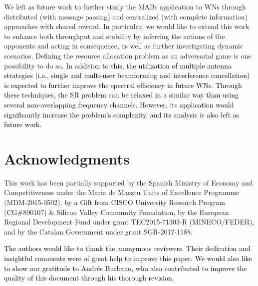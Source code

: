 \documentclass{article}
\begin{document}
	We left as future work to further study the MABs application to WNs through distributed (with message passing) and centralized (with complete information) approaches with shared reward. In particular, we would like to extend this work to enhance both throughput and stability by inferring the actions of the opponents and acting in consequence, as well as further investigating dynamic scenarios. Defining the resource allocation problem as an adversarial game is one possibility to do so. \textcolor{black}{In addition to this, the utilization of multiple antenna strategies (i.e., single and multi-user beamforming and interference cancellation) is expected to further improve the spectral efficiency in future WNs. Through these techniques, the SR problem can be relaxed in a similar way than using several non-overlapping frequency channels. However, its application would significantly increase the problem's complexity, and its analysis is also left as future work.}
	
	\section*{Acknowledgments}
	This work has been partially supported by the Spanish Ministry of Economy and Competitiveness under the Maria de Maeztu Units of Excellence Programme (MDM-2015-0502), by a Gift from CISCO University Research Program (CG\#890107) \& Silicon Valley Community Foundation, by the European Regional Development Fund under grant TEC2015-71303-R (MINECO/FEDER), and by the Catalan Government under grant SGR-2017-1188.
	
	\textcolor{black}{The authors would like to thank the anonymous reviewers. Their dedication and insightful comments were of great help to improve this paper. 
		We would also like to show our gratitude to Andrés Burbano, who also contributed to improve the quality of this document through his thorough revision.
	}
	
	\newpage
	
	
	
\end{document}
